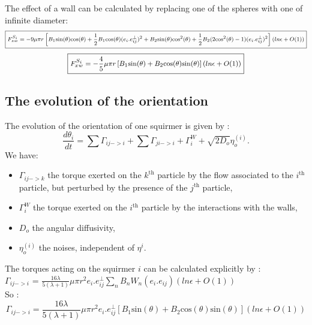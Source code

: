 \documentclass{article}
\begin{document}
The effect of a wall can be calculated by replacing one of the spheres with one of infinite diameter:
\begin{equation*}
    \footnotesize
    \boxed{F_{zw}^{S_i} = -9 \mu \pi r \left[ B_1 \mathrm{sin}(\theta)\mathrm{cos}(\theta) + \frac{1}{2} B_1  \mathrm{cos}(\theta) (e_i.e^{\perp}_{ij})^2 +B_2 \mathrm{sin}(\theta)\mathrm{cos}^2(\theta) + \frac{1}{2} B_2(2\mathrm{cos}^2(\theta) - 1) (e_i.e^{\perp}_{ij})^2\right](ln \epsilon + O(1))}\\
\end{equation*}
\begin{equation*}
    \footnotesize
    \boxed{F_{xw}^{S_i} = -\frac{4}{5} \mu \pi r \left[ B_1\mathrm{sin}(\theta) +B_2\mathrm{cos}(\theta)\mathrm{sin}(\theta)\right] (ln \epsilon + O(1))}
\end{equation*}

\subsection{The evolution of the orientation}
The evolution of the orientation of one squirmer is given by : 
$$
\boxed{\frac{d \theta_i}{dt} = \sum \Gamma_{ij->i} + \sum \Gamma_{ji->i} +  \Gamma_{i}^W + \sqrt{2D_o} \eta_o^{(i)}}.
$$
We have:
\begin{itemize}
    \item $\Gamma_{ij->k}$ the torque exerted on the $k^\mathrm{th}$ particle by the flow associated to the $i^\mathrm{th}$ particle, but perturbed by the presence of the $j^\mathrm{th}$ particle,
    \item $\Gamma_{i}^W$ the torque exerted on the $i^\mathrm{th}$ particle by the interactions with the walls,
    \item $D_o$ the angular diffusivity,
    \item $\eta_o^{(i)}$ the noises, independent of $\eta^{i}$.
\end{itemize}
\vspace{0.5cm}

The torques acting on the squirmer $i$ can be calculated explicitly by : \\
$\Gamma_{ij->i}$ = $\frac{16 \lambda}{5(\lambda +1)} \mu \pi r^2 e_i.e^{\perp}_{ij}\sum_{n} B_n W_n(e_i.e_{ij}) (ln \epsilon + O(1))$ \cite{Brumley}
\\ So :
\begin{equation*}
    \boxed{\Gamma_{ij->i} = \frac{16 \lambda}{5(\lambda +1)} \mu \pi r^2 e_i.e^{\perp}_{ij}\left[B_1\mathrm{sin}(\theta) +B_2\mathrm{cos}(\theta)\mathrm{sin}(\theta) \right] (ln \epsilon + O(1))}
\end{equation*}
\end{document}
